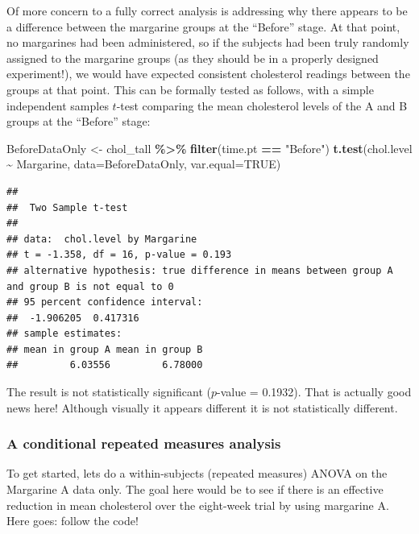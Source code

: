 \documentclass[
]{book}
\newenvironment{Shaded}{\begin{snugshade}}{\end{snugshade}}
\newcommand{\AttributeTok}[1]{\textcolor[rgb]{0.13,0.29,0.53}{#1}}
\newcommand{\ConstantTok}[1]{\textcolor[rgb]{0.56,0.35,0.01}{#1}}
\newcommand{\FunctionTok}[1]{\textcolor[rgb]{0.13,0.29,0.53}{\textbf{#1}}}
\newcommand{\NormalTok}[1]{#1}
\newcommand{\OtherTok}[1]{\textcolor[rgb]{0.56,0.35,0.01}{#1}}
\newcommand{\SpecialCharTok}[1]{\textcolor[rgb]{0.81,0.36,0.00}{\textbf{#1}}}
\newcommand{\StringTok}[1]{\textcolor[rgb]{0.31,0.60,0.02}{#1}}
\begin{document}
Of more concern to a fully correct analysis is addressing why there appears to be a difference between the margarine groups at the ``Before'' stage. At that point, no margarines had been administered, so if the subjects had been truly randomly assigned to the margarine groups (as they should be in a properly designed experiment!), we would have expected consistent cholesterol readings between the groups at that point. This can be formally tested as follows, with a simple independent samples \(t\)-test comparing the mean cholesterol levels of the A and B groups at the ``Before'' stage:

\begin{Shaded}
\begin{Highlighting}[]
\NormalTok{BeforeDataOnly }\OtherTok{\textless{}{-}}\NormalTok{ chol\_tall }\SpecialCharTok{\%\textgreater{}\%}
  \FunctionTok{filter}\NormalTok{(time.pt }\SpecialCharTok{==} \StringTok{"Before"}\NormalTok{)}
\FunctionTok{t.test}\NormalTok{(chol.level }\SpecialCharTok{\textasciitilde{}}\NormalTok{ Margarine, }\AttributeTok{data=}\NormalTok{BeforeDataOnly, }\AttributeTok{var.equal=}\ConstantTok{TRUE}\NormalTok{)}
\end{Highlighting}
\end{Shaded}

\begin{verbatim}
## 
##  Two Sample t-test
## 
## data:  chol.level by Margarine
## t = -1.358, df = 16, p-value = 0.193
## alternative hypothesis: true difference in means between group A and group B is not equal to 0
## 95 percent confidence interval:
##  -1.906205  0.417316
## sample estimates:
## mean in group A mean in group B 
##         6.03556         6.78000
\end{verbatim}

The result is not statistically significant (\(p\)-value = 0.1932). That is actually good news here! Although visually it appears different it is not statistically different.

\hypertarget{a-conditional-repeated-measures-analysis}{%
\subsubsection{A conditional repeated measures analysis}\label{a-conditional-repeated-measures-analysis}}

To get started, lets do a within-subjects (repeated measures) ANOVA on the Margarine A data only. The goal here would be to see if there is an effective reduction in mean cholesterol over the eight-week trial by using margarine A. Here goes: follow the code!
\end{document}
